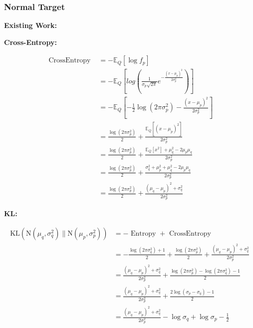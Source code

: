 \documentclass{article}
\begin{document}
\subsubsection{Normal Target}

\noindent \textbf{Existing Work:}

\noindent \textbf{Cross-Entropy:}

$$ \begin{aligned} \text { CrossEntropy }&=-\mathbb{E}_{Q}\left[\log f_{p}\right] \\ &=-\mathbb{E}_{Q}\left[log(\frac{1}{\sigma_{p} \sqrt{2 \pi}} e^{-\frac{(x-\mu_{p})^{2}}{2 \sigma_{p}^{2}}})\right] \\ &= -\mathbb{E}_{Q}\left[-\frac{1}{2} \log \left(2 \pi \sigma_{p}^{2}\right)-\frac{\left(x-\mu_{p}\right)^{2}}{2 \sigma_{p}^{2}}\right] \\ &=\frac{\log \left(2 \pi \sigma_{p}^{2}\right)}{2}+\frac{\mathbb{E}_{Q}\left[(x-\mu_{p})^2 \right]}{2 \sigma^2_{p}}\\ &=\frac{\log \left(2 \pi \sigma_{p}^{2}\right)}{2}+\frac{\mathbb{E}_{Q}\left[x^2 \right]+\mu_{q}^{2}-2\mu_{p}\mu_{q} }{2\sigma^2_{p}}\\ &=\frac{\log \left(2 \pi \sigma_{p}^{2}\right)}{2}+\frac{\sigma_{q}^{2}+\mu_{p}^{2}+\mu_{q}^{2}-2\mu_{p}\mu_{q} }{2\sigma^2_{p}}\\ &=\frac{\log \left(2 \pi \sigma_{p}^{2}\right)}{2}+\frac{\left(\mu_{q}-\mu_{p}\right)^{2}+\sigma_{q}^{2}}{2 \sigma^2_{p}} \end{aligned} $$


\noindent \textbf{KL:}

$$ \begin{aligned} \mathrm{KL}\left(\mathrm{N}\left(\mu_{q}, \sigma_{q}^{2}\right) \| \mathrm{N}\left(\mu_{p}, \sigma_{p}^{2}\right)\right)&=-\text { Entropy }+\text { CrossEntropy } \\ &=-\frac{\log \left(2 \pi \sigma_{q}^{2}\right)+1}{2}+ \frac{\log \left(2 \pi \sigma_{p}^{2}\right)}{2}+\frac{\left(\mu_{q}-\mu_{p}\right)^{2}+\sigma_{q}^{2}}{2 \sigma^2_{p}} \\ &=\frac{\left(\mu_{q}-\mu_{p}\right)^{2}+\sigma_{q}^{2}}{2 \sigma^2_{p}} +\frac{\log \left(2 \pi \sigma_{p}^{2}\right)- \log \left(2 \pi \sigma_{q}^{2}\right)-1}{2} \\ &=\frac{\left(\mu_{q}-\mu_{p}\right)^{2}+\sigma_{q}^{2}}{2 \sigma^2_{p}} +\frac{2\log \left(\sigma_{p}-\sigma_{q}\right)-1}{2} \\ &=\frac{\left(\mu_{q}-\mu_{p}\right)^{2}+\sigma_{q}^{2}}{2 \sigma^2_{p}}-\log \sigma_{q}+\log \sigma_{p}-\frac{1}{2} \end{aligned} $$
\end{document}
